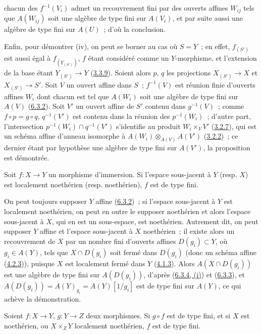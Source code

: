 chacun des $f^{-1}(V_i)$ admet un recouvrement fini par des ouverts affines
$W_{ij}$ tels que $A(W_{ij})$ soit une algèbre de type fini sur $A(V_i)$, et
par suite aussi une algèbre de type fini sur $A(U)$~; d'où la conclusion.

Enfin, pour démontrer (iv), on peut se borner au cas où $S=Y$~; en effet,
$f_{(S')}$ est aussi égal à $f_{(Y_{(S')})}$, $f$ étant considéré comme un
$Y$-morphisme, et l'extension de la base étant $Y_{(S')}\to Y$
(\hyperref[I.3.3.9-fr]{3.3.9}). Soient alors $p$, $q$ les projections
$X_{(S')}\to X$ et $X_{(S')}\to S'$. Soit $V$ un ouvert affine dans $S$~;
$f^{-1}(V)$ est réunion finie d'ouverts affines $W_i$ dont chacun est tel que
$A(W_i)$ soit une algèbre de type fini sur $A(V)$
(\hyperref[I.6.3.2-fr]{6.3.2}). Soit $V'$ un ouvert affine de $S'$ contenu
dans $g^{-1}(V)$~; comme $f\circ p=g\circ q$, $q^{-1}(V')$ est contenu dans la
réunion des $p^{-1}(W_i)$~; d'autre part, l'intersection
$p^{-1}(W_i)\cap q^{-1}(V')$ s'identifie au produit $W_i\times_V V'$
(\hyperref[I.3.2.7-fr]{3.2.7}), qui est un schéma affine d'anneau isomorphe à
$A(W_i)\otimes_{A(V)}A(V')$ (\hyperref[I.3.2.2-fr]{3.2.2})~; ce dernier étant
par hypothèse une algèbre de type fini sur $A(V')$, la proposition est
démontrée.

\begin{corollary}[6.3.5]
\label{I.6.3.5-fr}
Soit $f:X\to Y$ un morphisme d'immersion. Si l'espace sous-jacent à $Y$
(resp. $X$) est localement noethérien (resp. noethérien), $f$ est de type fini.
\end{corollary}

On peut toujours supposer $Y$ affine (\hyperref[I.6.3.2-fr]{6.3.2})~; si
l'espace sous-jacent à $Y$ est localement noethérien, on peut en outre le
supposer noethérien et alors l'espace sous-jacent à $X$, qui en est un
sous-espace, est noethérien. Autrement dit, on peut supposer $Y$ affine et
l'espace sous-jacent à $X$ noethérien~; il existe alors un recouvrement de $X$
par un nombre fini d'ouverts affines $D(g_i)\subset Y$, où $g_i\in A(Y)$, tels
que $X\cap D(g_i)$ soit fermé dans $D(g_i)$ (donc un schéma affine
(\hyperref[I.4.2.3-fr]{4.2.3})), puisque $X$ est localement fermé dans $Y$
(\hyperref[I.4.1.3-fr]{4.1.3}). Alors $A(X\cap D(g_i))$ est une algèbre de type
fini sur $A(D(g_i))$, d'après (\hyperref[I.6.3.4-fr]{6.3.4, (i)}) et
(\hyperref[I.6.3.3-fr]{6.3.3}), et
$A(D(g_i))=A(Y)_{g_i}=A(Y)[1/g_i]$ est de type fini sur $A(Y)$, ce qui achève
la démonstration.

\begin{corollary}[6.3.6]
\label{I.6.3.6-fr}
Soient $f:X\to Y$, $g:Y\to Z$ deux morphismes. Si $g\circ f$ est de type fini,
et si $X$ est noethérien, ou $X\times_Z Y$ localement noethérien, $f$ est de
type fini.
\end{corollary}

